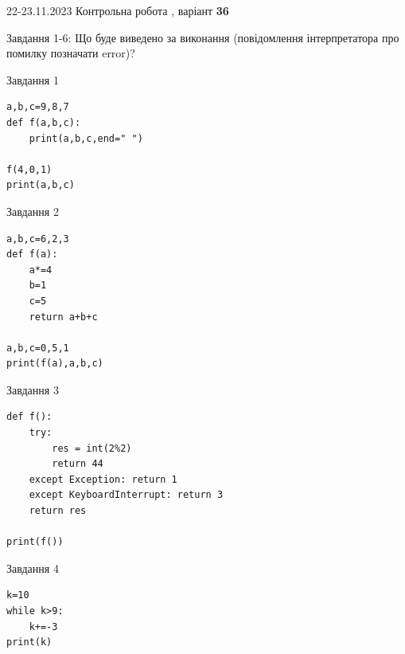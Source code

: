 \documentclass[12pt, ukrainian]{article}
\begin{document}
{{22-23.11.2023 Контрольна робота , варіант  \No \textbf { 36 }\par}}
{

Завдання 1-6: Що буде виведено за виконання (повідомлення інтерпретатора про помилку позначати error)?


\begin{minipage}[t]{9.7cm}                
{\begin{center}Завдання {1}\end{center}}
\begin{verbatim}
a,b,c=9,8,7
def f(a,b,c):
    print(a,b,c,end=" ")

f(4,0,1)
print(a,b,c)
\end{verbatim}     
\end{minipage}
\vline \hspace{8mm}
\begin{minipage}[t]{8.0cm}                
{\begin{center}Завдання {2}\end{center}}
\begin{verbatim}
a,b,c=6,2,3
def f(a):
    a*=4
    b=1
    c=5
    return a+b+c

a,b,c=0,5,1
print(f(a),a,b,c)
\end{verbatim}     
\end{minipage}

\vspace{15mm}
\begin{minipage}[t]{9.7cm}                
{\begin{center}Завдання {3}\end{center}}
\begin{verbatim}
def f():
    try:
        res = int(2%2)
        return 44
    except Exception: return 1
    except KeyboardInterrupt: return 3
    return res

print(f())
\end{verbatim}     
\end{minipage}
\vline \hspace{8mm}
\begin{minipage}[t]{8.0cm}                
{\begin{center}Завдання {4}\end{center}}
\begin{verbatim}
k=10
while k>9:
    k+=-3
print(k)
\end{verbatim}     
\end{minipage}

}
\end{document}

